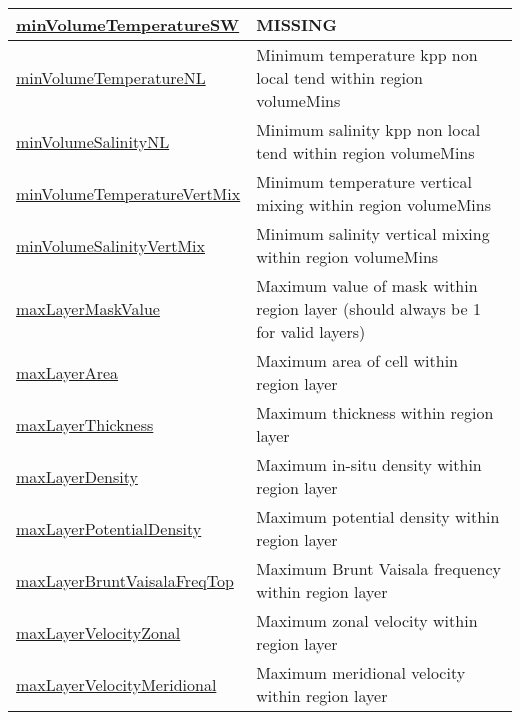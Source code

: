{\begin{center}
\begin{longtable}{| p{2.0in} | p{4.0in} |}
    \hline
    \hyperref[subsec:var_sec_layerVolumeWeightedAverageAM_minVolumeTemperatureSW]{minVolumeTemperatureSW} & {\bf \color{red} MISSING} \\
    \hline
    \hyperref[subsec:var_sec_layerVolumeWeightedAverageAM_minVolumeTemperatureNL]{minVolumeTemperatureNL} & Minimum temperature kpp non local tend within region volumeMins \\
    \hline
    \hyperref[subsec:var_sec_layerVolumeWeightedAverageAM_minVolumeSalinityNL]{minVolumeSalinityNL} & Minimum salinity kpp non local tend within region volumeMins \\
    \hline
    \hyperref[subsec:var_sec_layerVolumeWeightedAverageAM_minVolumeTemperatureVertMix]{minVolumeTemperatureVertMix} & Minimum temperature vertical mixing within region volumeMins \\
    \hline
    \hyperref[subsec:var_sec_layerVolumeWeightedAverageAM_minVolumeSalinityVertMix]{minVolumeSalinityVertMix} & Minimum salinity vertical mixing within region volumeMins \\
    \hline
    \hyperref[subsec:var_sec_layerVolumeWeightedAverageAM_maxLayerMaskValue]{maxLayerMaskValue} & Maximum value of mask within region layer (should always be 1 for valid layers) \\
    \hline
    \hyperref[subsec:var_sec_layerVolumeWeightedAverageAM_maxLayerArea]{maxLayerArea} & Maximum area of cell within region layer \\
    \hline
    \hyperref[subsec:var_sec_layerVolumeWeightedAverageAM_maxLayerThickness]{maxLayerThickness} & Maximum thickness within region layer \\
    \hline
    \hyperref[subsec:var_sec_layerVolumeWeightedAverageAM_maxLayerDensity]{maxLayerDensity} & Maximum in-situ density within region layer \\
    \hline
    \hyperref[subsec:var_sec_layerVolumeWeightedAverageAM_maxLayerPotentialDensity]{maxLayerPotentialDensity} & Maximum potential density within region layer \\
    \hline
    \hyperref[subsec:var_sec_layerVolumeWeightedAverageAM_maxLayerBruntVaisalaFreqTop]{maxLayerBruntVaisalaFreqTop} & Maximum Brunt Vaisala frequency within region layer \\
    \hline
    \hyperref[subsec:var_sec_layerVolumeWeightedAverageAM_maxLayerVelocityZonal]{maxLayerVelocityZonal} & Maximum zonal velocity within region layer \\
    \hline
    \hyperref[subsec:var_sec_layerVolumeWeightedAverageAM_maxLayerVelocityMeridional]{maxLayerVelocityMeridional} & Maximum meridional velocity within region layer \\

\end{longtable}
\end{center}}
